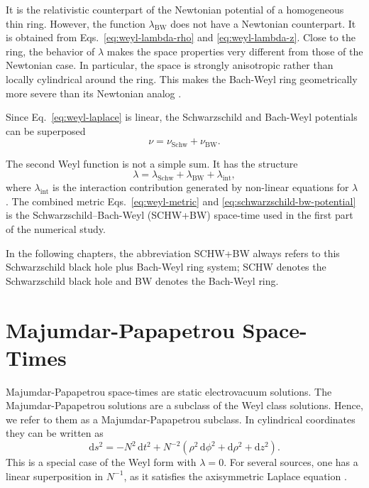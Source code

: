 It is the relativistic counterpart of the Newtonian potential of a homogeneous
thin ring. However, the function \(\lambda_{\mathrm{BW}}\) does not have a Newtonian counterpart.
It is obtained from Eqs.~\eqref{eq:weyl-lambda-rho} and
\eqref{eq:weyl-lambda-z}. Close to the ring,
the behavior of $\lambda$ makes the space properties very different from those of the Newtonian case. In particular,
the space is strongly anisotropic rather than locally cylindrical around the ring.
This makes the Bach-Weyl ring geometrically more severe than its Newtonian
analog \cite{Semerak2016}.

Since Eq.~\eqref{eq:weyl-laplace} is linear, the Schwarzschild and
Bach-Weyl potentials can be superposed
\begin{equation}
    \nu
    =
    \nu_{\mathrm{Schw}}
    +
    \nu_{\mathrm{BW}}.
    \label{eq:schwarzschild-bw-potential}
\end{equation}

The second Weyl function is not a simple sum. It has the structure
\begin{equation}
    \lambda
    =
    \lambda_{\mathrm{Schw}}
    +
    \lambda_{\mathrm{BW}}
    +
    \lambda_{\mathrm{int}},
    \label{eq:schwarzschild-bw-lambda}
\end{equation}
where \(\lambda_{\mathrm{int}}\) is the interaction contribution generated by
non-linear equations for \(\lambda\) \cite{Basovnik2010}. The combined metric
Eqs.~\eqref{eq:weyl-metric} and
\eqref{eq:schwarzschild-bw-potential} is the Schwarzschild--Bach-Weyl
(SCHW+BW) space-time used in the first part of the numerical study. 

In
the following chapters, the abbreviation SCHW+BW always refers to this
Schwarzschild black hole plus Bach-Weyl ring system; SCHW denotes the
Schwarzschild black hole and BW denotes the Bach-Weyl ring.

\section{Majumdar-Papapetrou Space-Times}
\label{sec:majumdar-papapetrou}

Majumdar-Papapetrou space-times are static electrovacuum solutions. The Majumdar-Papapetrou solutions are a subclass of the Weyl class solutions. Hence, we refer to them as a Majumdar-Papapetrou subclass. In cylindrical coordinates they can be written as
\begin{equation}
    \mathrm{d}s^2
    =
    -N^2\,\mathrm{d}t^2
    +
    N^{-2}
    \left(
        \rho^2\,\mathrm{d}\phi^2
        +
        \mathrm{d}\rho^2
        +
        \mathrm{d}z^2
    \right).
    \label{eq:mp-metric}
\end{equation}
This is a special case of the Weyl form with \(\lambda=0\). For several sources, one has a linear superposition in
\(N^{-1}\), as it satisfies the axisymmetric Laplace equation \cite{Kraus2025,Polcar2019}.

